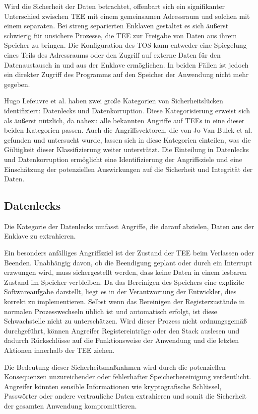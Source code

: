 Wird die Sicherheit der Daten betrachtet, offenbart sich ein signifikanter Unterschied zwischen TEE mit einem gemeinsamen Adressraum und solchen mit einem separaten. 
Bei streng separierten Enklaven gestaltet es sich äußerst schwierig für unsichere Prozesse, die TEE zur Freigabe von Daten aus ihrem Speicher zu bringen.
Die Konfiguration des TOS kann entweder eine Spiegelung eines Teils des Adressraums oder den Zugriff auf externe Daten für den Datenaustausch in und aus der Enklave ermöglichen. 
In beiden Fällen ist jedoch ein direkter Zugriff des Programms auf den Speicher der Anwendung nicht mehr gegeben.

Hugo Lefeuvre et al.\cite{CIVPaper} haben zwei große Kategorien von Sicherheitslücken identifiziert: Datenlecks und Datenkorruption. Diese Kategorisierung erweist sich als äußerst nützlich, da nahezu alle bekannten Angriffe auf TEEs in eine dieser beiden Kategorien passen. Auch die Angriffsvektoren, die von Jo Van Bulck et al.\cite{TEEPaper} gefunden und untersucht wurde, lassen sich in diese Kategorien einteilen, was die Gültigkeit dieser Klassifizierung weiter unterstützt. Die Einteilung in Datenlecks und Datenkorruption ermöglicht eine Identifizierung der Angriffsziele und eine Einschätzung der potenziellen Auswirkungen auf die Sicherheit und Integrität der Daten.

\subsection{Datenlecks}
Die Kategorie der Datenlecks umfasst Angriffe, die darauf abzielen, Daten aus der Enklave zu extrahieren. 

Ein besonders anfälliges Angriffsziel ist der Zustand der TEE beim Verlassen oder Beenden. Unabhängig davon, ob die Beendigung geplant oder durch ein Interrupt erzwungen wird, muss sichergestellt werden, dass keine Daten in einem lesbaren Zustand im Speicher verbleiben. Da das Bereinigen des Speichers eine explizite Softwareaufgabe darstellt, liegt es in der Verantwortung der Entwickler, dies korrekt zu implementieren. Selbst wenn das Bereinigen der Registerzustände in normalen Prozesswechseln üblich ist und automatisch erfolgt, ist diese Schwachstelle nicht zu unterschätzen. Wird dieser Prozess nicht ordnungsgemäß durchgeführt, können Angreifer Registereinträge oder den Stack auslesen und dadurch Rückschlüsse auf die Funktionsweise der Anwendung und die letzten Aktionen innerhalb der TEE ziehen.

Die Bedeutung dieser Sicherheitsmaßnahmen wird durch die potenziellen Konsequenzen unzureichender oder fehlerhafter Speicherbereinigung verdeutlicht. Angreifer könnten sensible Informationen wie kryptografische Schlüssel, Passwörter oder andere vertrauliche Daten extrahieren und somit die Sicherheit der gesamten Anwendung kompromittieren.

